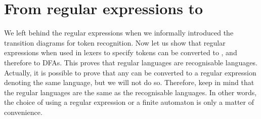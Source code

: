 \section{From regular expressions to }

We left behind the regular expressions when we informally introduced
the transition diagrams for token recognition. Now let us show that
regular expressions when used in lexers to specify tokens can be
converted to , and therefore to DFAs. This proves that regular
languages are recognisable languages. Actually, it is possible to
prove that any \eNFA can be converted to a regular expression denoting
the same language, but we will not do so. Therefore, keep in mind that
the regular languages are the same as the recognisable languages. In
other words, the choice of using a regular expression or a finite
automaton is only a matter of convenience.

